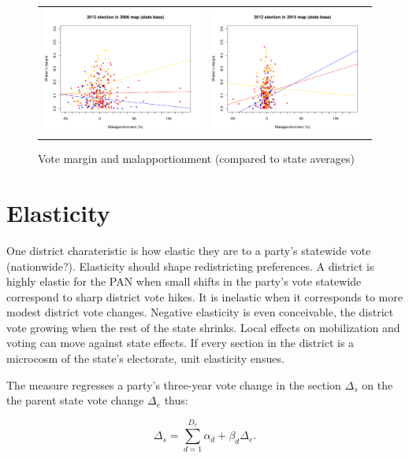 \documentclass[letter,12pt]{article}
\begin{document}
\begin{figure}
\begin{center}
\begin{tabular}{cc}
    \includegraphics[width=.4\columnwidth]{../graphs/malmg2012d0sta.pdf} & \includegraphics[width=.4\columnwidth]{../graphs/malmg2012d3sta.pdf} \\
  \end{tabular}
  \caption{Vote margin and malapportionment (compared to state averages)}\label{F:malmgnat}
\end{center}
\end{figure}


\section{Elasticity}

One district charateristic is how elastic they are to a party's statewide vote (nationwide?). Elasticity should shape redistricting preferences. A district is highly elastic for the PAN when small shifts in the party's vote statewide correspond to sharp district vote hikes. It is inelastic when it corresponds to more modest district vote changes. Negative elasticity is even conceivable, the district vote growing when the rest of the state shrinks. Local effects on mobilization and voting can move against state effects. If every section in the district is a microcosm of the state's electorate, unit elasticity ensues. 

The measure regresses a party's three-year vote change in the section $\Delta_s$ on the the parent state vote change $\Delta_e$ thus:  

\begin{equation}
\Delta_s = \sum\limits_{d=1}^{D_e} \alpha_d + \beta_d \Delta_e.
\end{equation}
\end{document}
